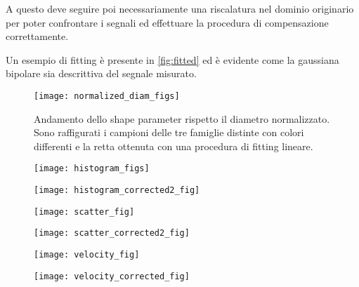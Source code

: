 A questo deve seguire poi necessariamente una riscalatura nel dominio originario per poter confrontare i segnali ed effettuare la procedura di compensazione correttamente.

Un esempio di fitting è presente in \cref{fig:fitted} ed è evidente come la gaussiana bipolare sia descrittiva del segnale misurato.

\begin{figure}[t!]
	\centering
	\texttt{[image: normalized\_diam\_figs]}
	\caption{Andamento dello shape parameter rispetto il diametro normalizzato. Sono raffigurati i campioni delle tre famiglie distinte con colori differenti e la retta ottenuta con una procedura di fitting lineare.}
	\label{fig:normalized}
\end{figure}

\begin{figure*}[t!]
	\centering
	\begin{subfigure}{0.5\linewidth}
		\centering
		\texttt{[image: histogram\_figs]}
		\caption{}
		\label{fig:histo}
	\end{subfigure}\hfill
	\begin{subfigure}{0.5\linewidth}
		\centering
		\texttt{[image: histogram\_corrected2\_fig]}
		\caption{}
	\end{subfigure}
	\caption{}
	\label{fig:histogram}
\end{figure*}

\begin{figure*}[t!]
	\centering
	\begin{subfigure}{0.5\linewidth}
		\centering
		\texttt{[image: scatter\_fig]}
		\caption{}
		\label{fig:scatter_init}
	\end{subfigure}\hfill
	\begin{subfigure}{0.5\linewidth}
		\centering
		\texttt{[image: scatter\_corrected2\_fig]}
		\caption{}
	\end{subfigure}
	\caption{}
	\label{fig:scatter}
\end{figure*}


\begin{figure*}[t!]
	\centering
	\begin{subfigure}{0.5\linewidth}
		\centering
		\texttt{[image: velocity\_fig]}
		\caption{}
	\end{subfigure}\hfill
	\begin{subfigure}{0.5\linewidth}
		\centering
		\texttt{[image: velocity\_corrected\_fig]}
		\caption{}
	\end{subfigure}
	\caption{}
	\label{fig:velocity}
\end{figure*}


